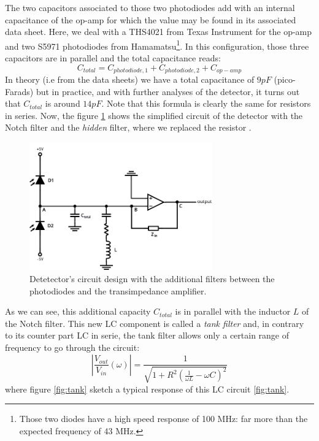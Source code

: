 \documentclass[11pt]{report}
\begin{document}
The two capacitors associated to those two photodiodes add with an internal capacitance of the op-amp for which the value may be found in its associated data sheet. Here, we deal with a THS4021 from Texas Instrument for the op-amp and two S5971 photodiodes from Hamamatsu\footnote{Those two diodes have a high speed response of 100 MHz: far more than the expected frequency of 43 MHz.}. In this configuration, those three capacitors are in parallel and the total capacitance reads:
\begin{equation}
C_{total} = C_{photodiode,1} + C_{photodiode,2} + C_{op-amp}
\end{equation}
In theory (i.e from the data sheets) we have a total capacitance of $9pF$ (pico-Farads) but in practice, and with further analyses of the detector, it turns out that $C_{total}$ is around $14pF$. Note that this formula is clearly the same for resistors in series. Now, the figure \ref{fig:detector-sec} shows the simplified circuit of the detector with the Notch filter and the \textit{hidden} filter, where we replaced the resistor .

\begin{figure}[h!]
\centering
\includegraphics[width=0.7\textwidth]{detector-sec}
\caption{Detetector's circuit design with the additional filters between the photodiodes and the transimpedance amplifier.}
\label{fig:detector-sec}
\end{figure}

As we can see, this additional capacity $C_{total}$ is in parallel with the inductor $L$ of the Notch filter. This new LC component is called a \textit{tank filter} and, in contrary to its counter part LC in serie, the tank filter allows only a certain range of frequency to go through the circuit:
\begin{equation}
\left\lvert \frac{V_{out}}{V_{in}} (\omega) \right\rvert = \frac{1}{\sqrt{1 + R^2\left(\frac{1}{\omega L} - \omega C\right)^2}}
\end{equation}
where figure \ref{fig:tank} sketch a typical response of this LC circuit \ref{fig:tank}. 
\end{document}

